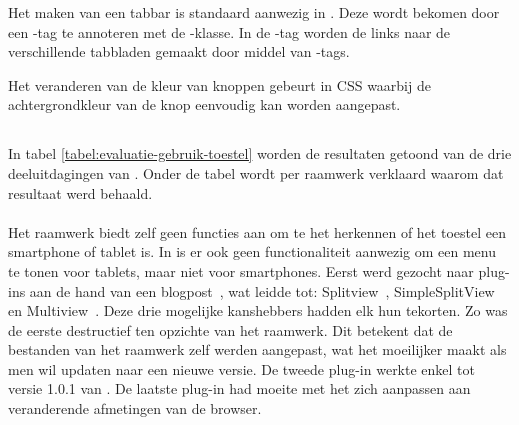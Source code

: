Het maken van een tabbar is standaard aanwezig in \lungo{}.
Deze wordt bekomen door een -tag te annoteren met de -klasse.
In de -tag worden de links naar de verschillende tabbladen gemaakt door middel van -tags.

Het veranderen van de kleur van knoppen gebeurt in CSS waarbij de achtergrondkleur van de knop eenvoudig kan worden aangepast.


\subsection{}
\label{sec:evaluatie-gebruik-toestel}

In tabel \ref{tabel:evaluatie-gebruik-toestel} worden de resultaten getoond van de drie deeluitdagingen van .
Onder de tabel wordt per raamwerk verklaard waarom dat resultaat werd behaald.

\begin{table}[H]
\centering
{}
\caption{Gebruik voor }
\label{tabel:evaluatie-gebruik-toestel}
\end{table}

\paragraph{\jqm}
Het raamwerk biedt zelf geen functies aan om te het herkennen of het toestel een smartphone of tablet is.
In \jqm{} is er ook geen functionaliteit aanwezig om een menu te tonen voor tablets, maar niet voor smartphones. 
Eerst werd gezocht naar plug-ins aan de hand van een blogpost~\cite{Deering2012}, wat leidde tot: Splitview~\cite{Rahman2013}, SimpleSplitView~\cite{Yared2013} en Multiview~\cite{Franck2012}. 
Deze drie mogelijke kanshebbers hadden elk hun tekorten. 
Zo was de eerste destructief ten opzichte van het raamwerk. 
Dit betekent dat de bestanden van het raamwerk zelf werden aangepast, wat het moeilijker maakt als men wil updaten naar een nieuwe versie. 
De tweede plug-in werkte enkel tot versie 1.0.1 van \jqm{}. 
De laatste plug-in had moeite met het zich aanpassen aan veranderende afmetingen van de browser. 

